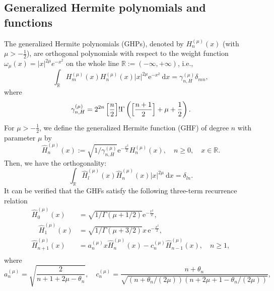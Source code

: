 \documentclass[pdflatex,sn-aps]{sn-jnl}%
\theoremstyle{thmstyleone}%
\theoremstyle{thmstyletwo}%
\theoremstyle{thmstylethree}%
\begin{document}
\subsection{Generalized Hermite polynomials and functions}
The generalized Hermite polynomials (GHPs), denoted by $H_n^{(\mu)}(x)$
(with $\mu > -\frac{1}{2}$), are orthogonal polynomials with respect to the weight function
$\omega_{\mu}(x)=|x|^{2\mu} e^{-x^2}$ on the whole line $\mathbb{R}:=(-\infty,+\infty)$,
i.e.,
\begin{equation}\label{eq:Hermite-poly}
  \int_{\mathbb{R}} H_m^{(\mu)}(x) H_n^{(\mu)}(x)|x|^{2 \mu} \mathrm{e}^{-x^2} \mathrm{~d} x=\gamma_{n,H}^{(\mu)} \delta_{m n},
\end{equation}
where
\begin{equation}\label{eq:gamma-n-H}
  \gamma_{n,H}^{(\mu)}=2^{2 n}\left[\frac{n}{2}\right]!\Gamma\left(\Bigl[\frac{n+1}{2}\Bigr]+\mu+\frac{1}{2}\right).
\end{equation}
For $\mu > -\frac{1}{2}$, we define the generalized Hermite function (GHF) of degree $n$ with parameter $\mu$ by
\begin{equation}\label{eq:Hermite-func}
  \widehat{H}_n^{(\mu)}(x):=\sqrt{1 / \gamma_{n,H}^{(\mu)}} \mathrm{e}^{-\frac{x^2}{2}} H_n^{(\mu)}(x), \quad n \geqslant 0, \quad x \in \mathbb{R}.
\end{equation}
Then, we have the orthogonality:
\begin{equation}\label{eq:Hermite-func-orth}
  \int_{\mathbb{R}} \widehat{H}_l^{(\mu)}(x) \widehat{H}_n^{(\mu)}(x)|x|^{2 \mu} \mathrm{~d} x=\delta_{l n}.
\end{equation}
It can be verified that the GHFs satisfy the following three-term
recurrence relation
\begin{equation}\label{eq:0823-3}
  \begin{aligned}
  \widehat{H}_0^{(\mu)}(x) &=\sqrt{1 / \Gamma(\mu+1 / 2)} \mathrm{e}^{-\frac{x^2}{2}}, \\
  \quad \widehat{H}_1^{(\mu)}(x) &=\sqrt{1 / \Gamma(\mu+3 / 2)} x\,\mathrm{e}^{-\frac{x^2}{2}},\\
  \widehat{H}_{n+1}^{(\mu)}(x) &=a_n^{(\mu)} x \widehat{H}_n^{(\mu)}(x)-c_n^{(\mu)} \widehat{H}_{n-1}^{(\mu)}(x), \quad n \geqslant 1, \\
  \end{aligned}
\end{equation}
where
\begin{equation}\label{eq:0823-4}
  a_n^{(\mu)}=\sqrt{\frac{2}{n+1+2 \mu-\theta_n}}, \quad c_n^{(\mu)}=\frac{n+\theta_n}{\sqrt{\left(n+\theta_n /(2 \mu)\right)\left(n+2 \mu+1-\theta_n /(2 \mu)\right)}} ,
\end{equation}
\end{document}
